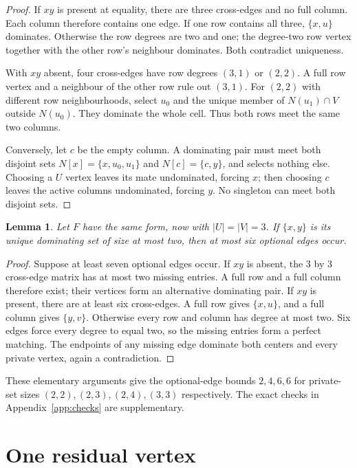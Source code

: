 \documentclass[11pt]{article}
\newtheorem{lemma}[theorem]{Lemma}
\theoremstyle{definition}
\theoremstyle{remark}
\begin{document}
\begin{proof}
If $xy$ is present at equality, there are three cross-edges and no full
column. Each column therefore contains one edge. If one row contains all
three, $\{x,u\}$ dominates. Otherwise the row degrees are two and one;
the degree-two row vertex together with the other row's neighbour dominates.
Both contradict uniqueness.

With $xy$ absent, four cross-edges have row degrees $(3,1)$ or $(2,2)$.
A full row vertex and a neighbour of the other row rule out $(3,1)$.
For $(2,2)$ with different row neighbourhoods, select $u_0$ and the unique
member of $N(u_1)\cap V$ outside $N(u_0)$. They dominate the whole cell.
Thus both rows meet the same two columns.

Conversely, let $c$ be the empty column. A dominating pair must meet both
disjoint sets $N[x]=\{x,u_0,u_1\}$ and $N[c]=\{c,y\}$, and selects nothing
else. Choosing a $U$ vertex leaves its mate undominated, forcing $x$;
then choosing $c$ leaves the active columns undominated, forcing $y$.
No singleton can meet both disjoint sets.
\end{proof}

\begin{lemma}\label{lem:eight33}
Let $F$ have the same form, now with $|U|=|V|=3$. If $\{x,y\}$ is its unique
dominating set of size at most two, then at most six optional edges occur.
\end{lemma}

\begin{proof}
Suppose at least seven optional edges occur. If $xy$ is absent, the $3$ by
$3$ cross-edge matrix has at most two missing entries. A full row and a
full column therefore exist; their vertices form an alternative dominating
pair. If $xy$ is present, there are at least six cross-edges. A full row
gives $\{x,u\}$, and a full column gives $\{y,v\}$. Otherwise every row and
column has degree at most two. Six edges force every degree to equal two,
so the missing entries form a perfect matching. The endpoints of any
missing edge dominate both centers and every private vertex, again a
contradiction.
\end{proof}

These elementary arguments give the optional-edge bounds $2,4,6,6$ for
private-set sizes $(2,2),(2,3),(2,4),(3,3)$ respectively. The exact checks
in Appendix~\ref{app:checks} are supplementary.

\section{One residual vertex}\label{sec:upper}
\end{document}
